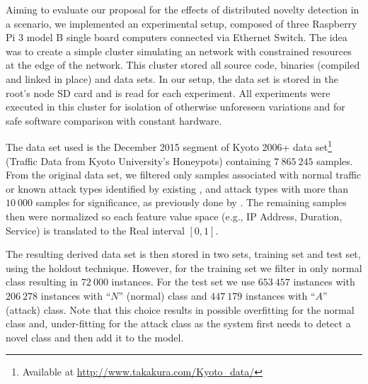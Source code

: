 
Aiming to evaluate our proposal for the effects of distributed novelty detection
in a \iot \nids scenario, we implemented an experimental setup, composed of three Raspberry Pi 3 model B single board
computers connected via Ethernet Switch. The idea was to create a simple cluster simulating an
\iot network with constrained resources at the edge of the network.
This cluster stored all source code, binaries (compiled and linked in place) and
data sets.
In our setup, the data set is stored in the root's node SD card and is read for
each experiment.
All experiments were executed in this cluster for isolation of otherwise
unforeseen variations and for safe software comparison with constant hardware.

The data set used is the December 2015 segment of
Kyoto 2006+ data set\footnote{Available at \url{http://www.takakura.com/Kyoto\_data/}}
(Traffic Data from Kyoto University's Honeypots) \cite{Song2011}
containing $7\:865\:245$ samples.
From the original data set, we filtered only samples associated with normal traffic
or known attack types identified by existing \nids, and attack types with more
than $10\:000$ samples for significance, as previously done by
\cite{Cassales2019a}.
The remaining samples then were normalized so each feature value space (e.g., IP
Address, Duration, Service) is translated to the Real interval $[0, 1]$.


The resulting derived data set is then stored in two sets,
training set and test set, using the holdout technique.
However, for the training set we filter in only normal class
resulting in $72\:000$ instances.
For the test set we use $653\:457$ instances with
$206\:278$ instances with ``$N$'' (normal) class and
$447\:179$ instances with ``$A$'' (attack) class.
Note that this choice results in possible overfitting for the normal class and,
under-fitting for the attack class as the system first needs to detect a novel class and
then add it to the model.

